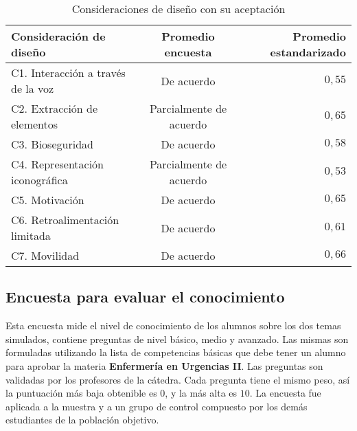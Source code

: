 \begin{table}
\centering
\caption{Consideraciones de diseño con su aceptación}
\begin{tabular}{lcr}
\toprule
Consideración de diseño     & Promedio encuesta     & Promedio estandarizado \\
\midrule
C1. Interacción a través de la voz  & De acuerdo              & $0,55$ \\
C2. Extracción de elementos & Parcialmente de acuerdo & $0,65$ \\
C3. Bioseguridad            & De acuerdo              & $0,58$ \\
C4. Representación iconográfica  & Parcialmente de acuerdo & $0,53$ \\
C5. Motivación              & De acuerdo              & $0,65$ \\
C6. Retroalimentación limitada      & De acuerdo              & $0,61$ \\
C7. Movilidad               & De acuerdo              & $0,66$ \\
\bottomrule
\end{tabular}
\label{tab:resultado_resumen_hipotesis}
\end{table}


\subsection{Encuesta para evaluar el conocimiento}

Esta encuesta mide el nivel de conocimiento de los alumnos sobre los dos temas 
simulados, contiene preguntas de nivel básico, medio y avanzado. Las mismas 
son formuladas utilizando la lista de competencias básicas que debe tener un 
alumno para aprobar la materia \textbf{Enfermería en Urgencias II}. Las 
preguntas son validadas  por los profesores de la cátedra. Cada pregunta 
tiene el mismo peso, así la puntuación más baja obtenible es $0$, y la más 
alta es $10$. La encuesta fue aplicada a la muestra y a un grupo de control 
compuesto por los demás estudiantes de la población objetivo.

